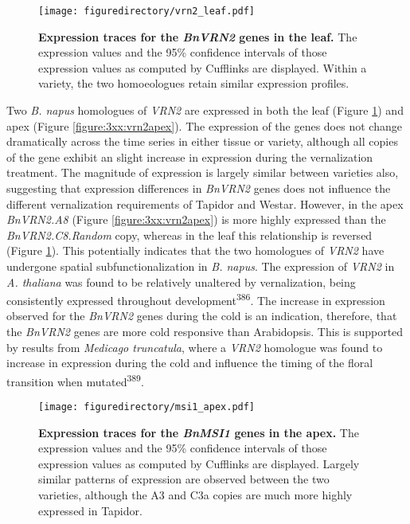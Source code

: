 \documentclass[12pt,]{book}
\begin{document}
\begin{figure}[htbp]
\centering
\texttt{[image: figuredirectory/vrn2\_leaf.pdf]}
\caption{\textbf{Expression traces for the \emph{BnVRN2} genes in the
leaf.} The expression values and the 95\% confidence intervals of those
expression values as computed by Cufflinks are displayed. Within a
variety, the two homoeologues retain similar expression
profiles.}\label{figure:3xx:vrn2leaf}
\end{figure}

Two \emph{B. napus} homologues of \emph{VRN2} are expressed in both the
leaf (Figure \ref{figure:3xx:vrn2leaf}) and apex (Figure
\ref{figure:3xx:vrn2apex}). The expression of the genes does not change
dramatically across the time series in either tissue or variety,
although all copies of the gene exhibit an slight increase in expression
during the vernalization treatment. The magnitude of expression is
largely similar between varieties also, suggesting that expression
differences in \emph{BnVRN2} genes does not influence the different
vernalization requirements of Tapidor and Westar. However, in the apex
\emph{BnVRN2.A8} (Figure \ref{figure:3xx:vrn2apex}) is more highly
expressed than the \emph{BnVRN2.C8.Random} copy, whereas in the leaf
this relationship is reversed (Figure \ref{figure:3xx:vrn2leaf}). This
potentially indicates that the two homologues of \emph{VRN2} have
undergone spatial subfunctionalization in \emph{B. napus}. The
expression of \emph{VRN2} in \emph{A. thaliana} was found to be
relatively unaltered by vernalization, being consistently expressed
throughout development\textsuperscript{386}. The increase in expression
observed for the \emph{BnVRN2} genes during the cold is an indication,
therefore, that the \emph{BnVRN2} genes are more cold responsive than
Arabidopsis. This is supported by results from \emph{Medicago
truncatula}, where a \emph{VRN2} homologue was found to increase in
expression during the cold and influence the timing of the floral
transition when mutated\textsuperscript{389}.

\begin{figure}[htbp]
\centering
\texttt{[image: figuredirectory/msi1\_apex.pdf]}
\caption{\textbf{Expression traces for the \emph{BnMSI1} genes in the
apex.} The expression values and the 95\% confidence intervals of those
expression values as computed by Cufflinks are displayed. Largely
similar patterns of expression are observed between the two varieties,
although the A3 and C3a copies are much more highly expressed in
Tapidor.}\label{figure:3xx:msiapex}
\end{figure}
\end{document}
